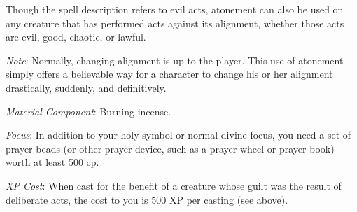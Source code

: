 {	Though the spell description refers to evil acts, atonement can also be used on any creature that has performed acts against its alignment, whether those acts are evil, good, chaotic, or lawful.

	\textit{Note}: Normally, changing alignment is up to the player. This use of atonement simply offers a believable way for a character to change his or her alignment drastically, suddenly, and definitively.

	\textit{Material Component}:
	Burning incense.

	\textit{Focus}:
	In addition to your holy symbol or normal divine focus, you need a set of prayer beads (or other prayer device, such as a prayer wheel or prayer book) worth at least 500 cp.

	\textit{XP Cost}:
	When cast for the benefit of a creature whose guilt was the result of deliberate acts, the cost to you is 500 XP per casting (see above).

}
